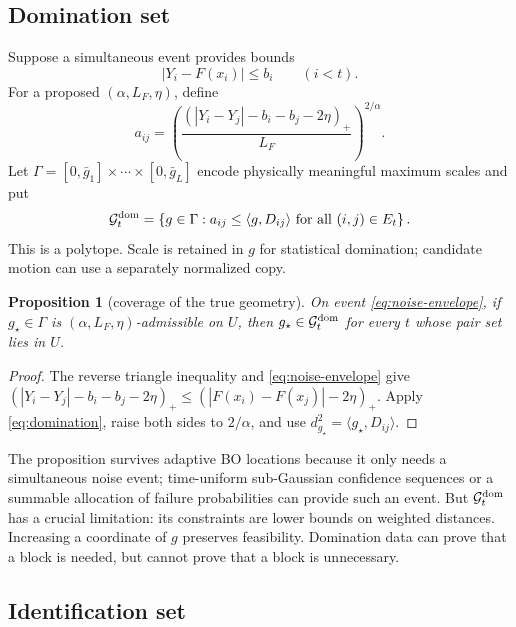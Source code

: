 \documentclass[11pt]{article}
\newtheorem{proposition}[theorem]{Proposition}
\theoremstyle{definition}
\theoremstyle{remark}
\newcommand{\Gg}{\mathcal G}
\newcommand{\1}{\mathbf 1}
\begin{document}
\subsection{Domination set}

Suppose a simultaneous event provides bounds
\begin{equation}\label{eq:noise-envelope}
  |Y_i-F(x_i)|\le b_i
  \qquad (i<t).
\end{equation}
For a proposed $(\alpha,L_F,\eta)$, define
\begin{equation}\label{eq:secant-threshold}
  a_{ij}=
  \left(
    \frac{(|Y_i-Y_j|-b_i-b_j-2\eta)_+}{L_F}
  \right)^{2/\alpha}.
\end{equation}
Let $\Gamma=[0,\bar g_1]\times\cdots\times[0,\bar g_L]$ encode physically meaningful maximum
scales and put
\begin{equation}\label{eq:dom-set}
  \Gg_t^{\rm dom}=
  \left\{g\in\Gamma:
  a_{ij}\le\langle g,D_{ij}\rangle
  \text{ for all }(i,j)\in E_t\right\}.
\end{equation}
This is a polytope.  Scale is retained in $g$ for statistical domination; candidate motion can use
a separately normalized copy.

\begin{proposition}[coverage of the true geometry]\label{prop:dom-coverage}
On event \eqref{eq:noise-envelope}, if $g_\star\in\Gamma$ is
$(\alpha,L_F,\eta)$-admissible on $U$, then $g_\star\in\Gg_t^{\rm dom}$ for every $t$ whose pair
set lies in $U$.
\end{proposition}
\begin{proof}
The reverse triangle inequality and \eqref{eq:noise-envelope} give
$(|Y_i-Y_j|-b_i-b_j-2\eta)_+\le
(|F(x_i)-F(x_j)|-2\eta)_+$.  Apply \eqref{eq:domination}, raise both sides to $2/\alpha$, and use
$d_{g_\star}^2=\langle g_\star,D_{ij}\rangle$.
\end{proof}

The proposition survives adaptive BO locations because it only needs a simultaneous noise event;
time-uniform sub-Gaussian confidence sequences or a summable allocation of failure probabilities can
provide such an event.  But $\Gg_t^{\rm dom}$ has a crucial limitation: its constraints are lower
bounds on weighted distances.  Increasing a coordinate of $g$ preserves feasibility.  Domination
data can prove that a block is needed, but cannot prove that a block is unnecessary.

\subsection{Identification set}
\end{document}
